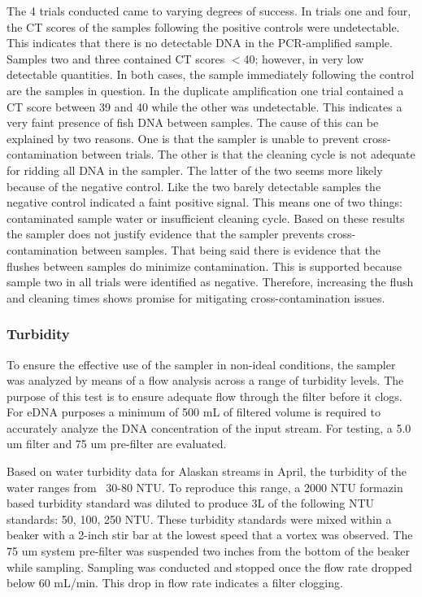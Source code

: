 \documentclass[11pt, letterpaper]{article}
\begin{document}
The 4 trials conducted came to varying degrees of success. In trials one and four, the CT scores of the samples following the positive controls were undetectable. This indicates that there is no detectable DNA in the PCR-amplified sample. Samples two and three contained CT scores $<$40; however, in very low detectable quantities. In both cases, the sample immediately following the control are the samples in question. In the duplicate amplification one trial contained a CT score between 39 and 40 while the other was undetectable. This indicates a very faint presence of fish DNA between samples. The cause of this can be explained by two reasons. One is that the sampler is unable to prevent cross-contamination between trials. The other is that the cleaning cycle is not adequate for ridding all DNA in the sampler. The latter of the two seems more likely because of the negative control. Like the two barely detectable samples the negative control indicated a faint positive signal. This means one of two things: contaminated sample water or insufficient cleaning cycle. Based on these results the sampler does not justify evidence that the sampler prevents cross-contamination between samples. That being said there is evidence that the flushes between samples do minimize contamination. This is supported because sample two in all trials were identified as negative. Therefore, increasing the flush and cleaning times shows promise for mitigating cross-contamination issues.

\subsubsection{Turbidity}
To ensure the effective use of the sampler in non-ideal conditions, the sampler was analyzed by means of a flow analysis across a range of turbidity levels. The purpose of this test is to ensure adequate flow through the filter before it clogs. For eDNA purposes a minimum of 500 mL of filtered volume is required to accurately analyze the DNA concentration of the input stream. For testing, a 5.0 um filter and 75 um pre-filter are evaluated.
\newline\par
Based on water turbidity data for Alaskan streams in April, the turbidity of the water ranges from ~30-80 NTU. To reproduce this range, a 2000 NTU formazin based turbidity standard was diluted to produce 3L of the following NTU standards: 50, 100, 250 NTU. These turbidity standards were mixed within a beaker with a 2-inch stir bar at the lowest speed that a vortex was observed. The 75 um system pre-filter was suspended two inches from the bottom of the beaker while sampling. Sampling was conducted and stopped once the flow rate dropped below 60 mL/min. This drop in flow rate indicates a filter clogging.
\end{document}
